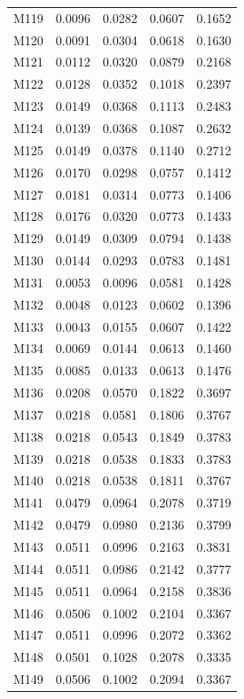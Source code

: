 \begin{longtable}{lrrrr}
M119 & 0.0096 & 0.0282 & 0.0607 & 0.1652 \\
M120 & 0.0091 & 0.0304 & 0.0618 & 0.1630 \\
M121 & 0.0112 & 0.0320 & 0.0879 & 0.2168 \\
M122 & 0.0128 & 0.0352 & 0.1018 & 0.2397 \\
M123 & 0.0149 & 0.0368 & 0.1113 & 0.2483 \\
M124 & 0.0139 & 0.0368 & 0.1087 & 0.2632 \\
M125 & 0.0149 & 0.0378 & 0.1140 & 0.2712 \\
M126 & 0.0170 & 0.0298 & 0.0757 & 0.1412 \\
M127 & 0.0181 & 0.0314 & 0.0773 & 0.1406 \\
M128 & 0.0176 & 0.0320 & 0.0773 & 0.1433 \\
M129 & 0.0149 & 0.0309 & 0.0794 & 0.1438 \\
M130 & 0.0144 & 0.0293 & 0.0783 & 0.1481 \\
M131 & 0.0053 & 0.0096 & 0.0581 & 0.1428 \\
M132 & 0.0048 & 0.0123 & 0.0602 & 0.1396 \\
M133 & 0.0043 & 0.0155 & 0.0607 & 0.1422 \\
M134 & 0.0069 & 0.0144 & 0.0613 & 0.1460 \\
M135 & 0.0085 & 0.0133 & 0.0613 & 0.1476 \\
M136 & 0.0208 & 0.0570 & 0.1822 & 0.3697 \\
M137 & 0.0218 & 0.0581 & 0.1806 & 0.3767 \\
M138 & 0.0218 & 0.0543 & 0.1849 & 0.3783 \\
M139 & 0.0218 & 0.0538 & 0.1833 & 0.3783 \\
M140 & 0.0218 & 0.0538 & 0.1811 & 0.3767 \\
M141 & 0.0479 & 0.0964 & 0.2078 & 0.3719 \\
M142 & 0.0479 & 0.0980 & 0.2136 & 0.3799 \\
M143 & 0.0511 & 0.0996 & 0.2163 & 0.3831 \\
M144 & 0.0511 & 0.0986 & 0.2142 & 0.3777 \\
M145 & 0.0511 & 0.0964 & 0.2158 & 0.3836 \\
M146 & 0.0506 & 0.1002 & 0.2104 & 0.3367 \\
M147 & 0.0511 & 0.0996 & 0.2072 & 0.3362 \\
M148 & 0.0501 & 0.1028 & 0.2078 & 0.3335 \\
M149 & 0.0506 & 0.1002 & 0.2094 & 0.3367 \\

\end{longtable}

